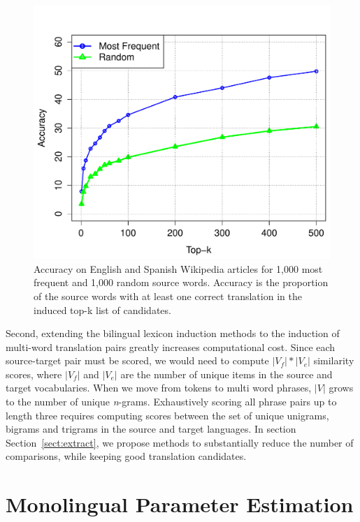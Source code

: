 \documentclass[11pt]{article}
\newcommand{\secref}[1]{Section~\ref{#1}}
\begin{document}
\begin{figure}[t]
\begin{center}
\includegraphics[width=\linewidth]{../figures/lexinduct/lexinduct.pdf}
\caption{Accuracy on English and Spanish Wikipedia articles for 1,000 most frequent and 1,000 random source words.  Accuracy is the proportion of the source words with at least one correct translation in the induced top-k list of candidates.}
\label{fig:lexinduct}
\end{center}
\vskip -0.2in
\end{figure}

Second, extending the bilingual lexicon induction methods to the induction of multi-word translation pairs greatly increases computational cost. Since each source-target pair must be scored, we would need to compute $|V_{f}| * |V_{e}|$ similarity scores, where $|V_{f}|$ and $|V_{e}|$ are the number of unique items in the source and target vocabularies. When we move from tokens to multi word phrases, $|V|$ grows to the number of unique {\it n}-grams. Exhaustively scoring all phrase pairs up to length three requires computing scores between the set of unique unigrams, bigrams and trigrams in the source and target languages.  In section \secref{sect:extract}, we propose methods to substantially reduce the number of comparisons, while keeping good translation candidates.


\section{Monolingual Parameter Estimation} \label{sect:mono}
\end{document}

